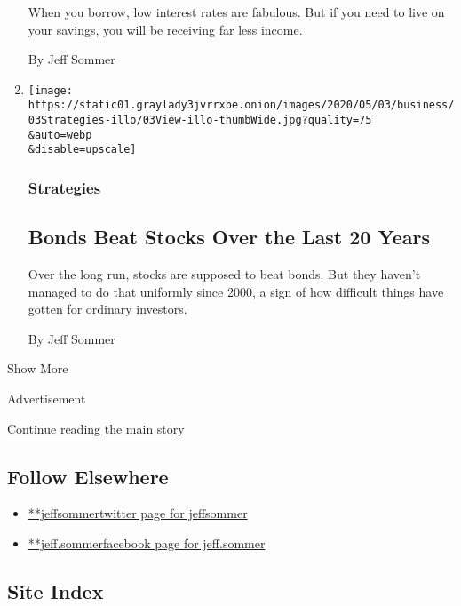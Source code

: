 \begin{enumerate}
  When you borrow, low interest rates are fabulous. But if you need to
  live on your savings, you will be receiving far less income.

  By Jeff Sommer
\item
  \href{/2020/05/01/business/bonds-beat-stocks-over-20-years.html}{}

  \texttt{[image: https://static01.graylady3jvrrxbe.onion/images/2020/05/03/business/03Strategies-illo/03View-illo-thumbWide.jpg?quality=75\\\&auto=webp\\\&disable=upscale]}

  \hypertarget{strategies-8}{%
  \subsubsection{Strategies}\label{strategies-8}}

  \hypertarget{bonds-beat-stocks-over-the-last-20-years}{%
  \subsection{Bonds Beat Stocks Over the Last 20
  Years}\label{bonds-beat-stocks-over-the-last-20-years}}

  Over the long run, stocks are supposed to beat bonds. But they haven't
  managed to do that uniformly since 2000, a sign of how difficult
  things have gotten for ordinary investors.

  By Jeff Sommer
\end{enumerate}

Show More

Advertisement

\protect\hyperlink{after-mid2}{Continue reading the main story}

\hypertarget{follow-elsewhere}{%
\subsection{Follow Elsewhere}\label{follow-elsewhere}}

\begin{itemize}
\tightlist
\item
  \href{https://twitter.com/jeffsommer}{**jeffsommertwitter page for
  jeffsommer}
\item
  \href{https://www.facebookcorewwwi.onion/jeff.sommer}{**jeff.sommerfacebook
  page for jeff.sommer}
\end{itemize}

\hypertarget{site-index}{%
\subsection{Site Index}\label{site-index}}

